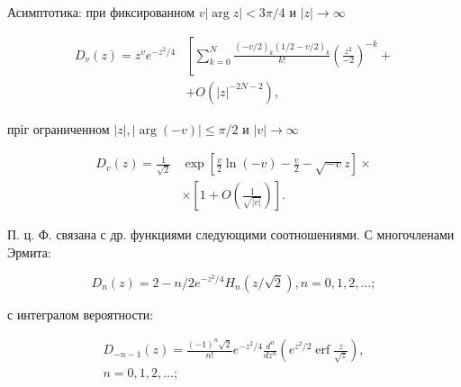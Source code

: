\documentclass[10pt]{article}
\begin{document}
Асимптотика: при фиксированном $v|\arg z|<3 \pi / 4$ и $|z| \rightarrow \infty$



\[

\begin{aligned}

D_{v}(z)=z^{v} e^{-z^{2} / 4} & {\left[\sum_{k=0}^{N} \frac{(-v / 2)_{k}(1 / 2-v / 2)_{k}}{k !}\left(\frac{z^{2}}{-2}\right)^{-k}+\right.} \\

& +O\left(|z|^{-2 N-2}\right),

\end{aligned}

\]



пріг ограниченном $|z|,|\arg (-v)| \leqslant \pi / 2$ и $|v| \rightarrow \infty$



\[

\begin{aligned}

D_{v}(z)=\frac{1}{\sqrt{2}} & \exp \left[\frac{v}{2} \ln (-v)-\frac{v}{2}-\sqrt{-v} z\right] \times \\

& \times\left[1+O\left(\frac{1}{\sqrt{|v|}}\right)\right] .

\end{aligned}

\]



П. ц. Ф. связана с др. функциями следующими соотношениями. С многочленами Эрмита:



\[

D_{n}(z)=2-n / 2 e^{-z^{2} / 4} H_{n}(z / \sqrt{2}), n=0,1,2, \ldots ;

\]



с интегралом вероятности:



\[

\begin{gathered}

D_{-n-1}(z)=\frac{(-1)^{n} \sqrt{2}}{n !} e^{-z^{2} / 4} \frac{d^{n}}{d z^{n}}\left(e^{z^{2} / 2} \operatorname{erf} \frac{z}{\sqrt{z}}\right), \\

n=0,1,2, \ldots ;

\end{gathered}

\]
\end{document}
